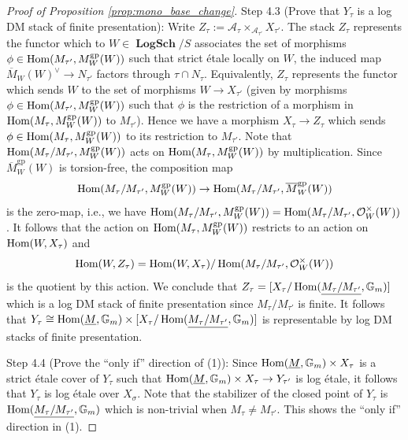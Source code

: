 \documentclass[11pt]{amsart}
\theoremstyle{definition}
\theoremstyle{remark}
\def\gp{\mathrm{gp}}
\DeclareMathOperator{\LogSch}{\mathbf{LogSch}}
\DeclareMathOperator{\Hom}{\textup{Hom}}
\begin{document}
\begin{proof}[Proof of Proposition \ref{prop:mono_base_change}]
	Step 4.3 (Prove that $Y_{\tau}$ is a log DM stack of finite presentation): Write $Z_{\tau}:=\mathcal{A}_{\tau}\times_{\mathcal{A}_{\tau'}}X_{\tau'}$.
	The stack $Z_{\tau}$ represents the functor which to $W\in \LogSch/S$ associates the set of morphisms $\phi\in \Hom(M_{\tau'},M_{W}^{\gp}(W))$
	such that strict étale locally on $W$, the induced map $\overline{M}_W(W)^{\vee}\to N_{\tau'}$ factors through $\tau\cap N_{\tau}$.
	Equivalently, $Z_{\tau}$ represents the functor which sends $W$ to the set of morphisms $W\to X_{\tau'}$ (given by morphisms
	$\phi\in \Hom(M_{\tau'},M_{W}^{\gp}(W))$ such that $\phi$ is the restriction of a morphism in $\Hom(M_{\tau},M_W^{\gp}(W))$ to $M_{\tau'}$).
	Hence we have a morphism $X_{\tau}\to Z_{\tau}$ which sends $\phi\in \Hom(M_{\tau},M_W^{\gp}(W))$ to its restriction to $M_{\tau'}$.
	Note that $\Hom(M_{\tau}/M_{\tau'},M_W^{\gp}(W))$ acts on $\Hom(M_{\tau},M_W^{\gp}(W))$ by multiplication. Since $\overline{M}_W^{\gp}(W)$
	is torsion-free, the composition map
	$$\Hom(M_{\tau}/M_{\tau'},M_{W}^{\gp}(W))\to \Hom(M_{\tau}/M_{\tau'},\overline{M}_W^{\gp}(W))$$
	is the zero-map, i.e., we have $\Hom(M_{\tau}/M_{\tau'},M_W^{\gp}(W))=\Hom(M_{\tau}/M_{\tau'},\mathcal{O}_{W}^{\times}(W))$.
	It follows that the action on $\Hom(M_{\tau},M_W^{\gp}(W))$ restricts to an action on $\Hom(W,X_{\tau})$ and
	$$\Hom(W,Z_{\tau})=\Hom(W,X_{\tau})/\Hom(M_{\tau}/M_{\tau'},\mathcal{O}_{W}^{\times}(W))$$
	is the quotient by this action.
	We conclude that $Z_{\tau}=[X_{\tau}/\Hom(\underline{M_{\tau}/M_{\tau'}},\mathbb{G}_m)]$ which is a log DM stack of finite presentation since
	$M_{\tau}/M_{\tau'}$ is finite. It follows that $Y_{\tau}\cong \Hom(\underline{M},\mathbb{G}_m)\times [X_{\tau}/\Hom(\underline{M_{\tau}/M_{\tau'}},\mathbb{G}_m)]$
	is representable by log DM stacks of finite presentation.

	Step 4.4 (Prove the ``only if'' direction of (1)): Since $\Hom(\underline{M},\mathbb{G}_m)\times X_{\tau}$ is a strict étale cover of $Y_{\tau}$
	such that $\Hom(\underline{M},\mathbb{G}_m)\times X_{\tau}\to Y_{\tau'}$ is log étale, it follows that $Y_{\tau}$ is log étale over $X_{\sigma}$. Note that the stabilizer
	of the closed point of $Y_{\tau}$ is $\Hom(\underline{M_{\tau}/M_{\tau'}},\mathbb{G}_m)$ which is non-trivial when $M_{\tau}\neq M_{\tau'}$. This
	shows the ``only if'' direction in (1).


\end{proof}
\end{document}
